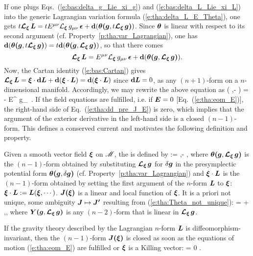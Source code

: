If one plugs Eqs.~(\ref{e:bas:delta_g_Lie_xi_g}) and (\ref{e:bas:delta_L_Lie_xi_L})
into the generic Lagrangian variation formula (\ref{e:tha:delta_L_E_Theta}), one gets
$t \bm{\mathcal{L}}_{\bm{\xi}}\, \bm{L}  = t E^{\mu\nu} {\mathcal{L}}_{\bm{\xi}}\, g_{\mu\nu} \,\bm{\epsilon} + \mathbf{d}( \bm{\theta}\textbf{(}\bm{g},t\bm{\mathcal{L}}_{\bm{\xi}}\,\bm{g}\textbf{)})$.
Since $\bm{\theta}$ is linear with respect to its second argument (cf. Property~\ref{p:tha:var_Lagrangian}),
one has
$\mathbf{d}( \bm{\theta}\textbf{(}\bm{g},t\bm{\mathcal{L}}_{\bm{\xi}}\,\bm{g}\textbf{)}) =  t \mathbf{d}( \bm{\theta}\textbf{(}\bm{g},\bm{\mathcal{L}}_{\bm{\xi}}\,\bm{g}\textbf{)})$, so that there comes
\[
    \bm{\mathcal{L}}_{\bm{\xi}}\, \bm{L}  = E^{\mu\nu} {\mathcal{L}}_{\bm{\xi}}\, g_{\mu\nu} \,\bm{\epsilon} + \mathbf{d}( \bm{\theta}\textbf{(}\bm{g},\bm{\mathcal{L}}_{\bm{\xi}}\,\bm{g}\textbf{)}) .
\]
Now, the Cartan identity (\ref{e:bas:Cartan}) gives
$\bm{\mathcal{L}}_{\bm{\xi}}\, \bm{L} = \bm{\xi} \cdot\mathbf{d} \bm{L} + \mathbf{d}(\bm{\xi}\cdot\bm{L}) = \mathbf{d}(\bm{\xi}\cdot\bm{L})$
since $\mathbf{d} \bm{L} = 0$, as any $(n+1)$-form on a $n$-dimensional manifold.
Accordingly, we may rewrite the above equation as
\be \label{e:tha:dd_pre_J_E}
    \dd\left(  \w{\theta}\lld{},\Lie{\xi}\rld - \w{\xi}\cdot{} \right) =
    - E^{\mu\nu} \Liec{\xi} g_{\mu\nu} \,\weps .
\ee
If the field equations are fulfilled, i.e. if $\bm{E} = 0$ [Eq.~(\ref{e:tha:eom_E})], the
right-hand side of Eq.~(\ref{e:tha:dd_pre_J_E}) is zero, which implies that the
argument of the exterior derivative in the left-hand side is a closed
$(n-1)$-form. This defines a conserved current and motivates the following definition and property.

\begin{prop}
\label{p:tha:Noether_current}
Given a smooth vector field $\bm{\xi}$ on $\mathscr{M}$,
the  is defined by \cite{Wald93,IyerW94}
\be \label{e:tha:def_Noether_current}
    \lld\w{\xi}\rld := \w{\theta}\lld{},\Lie{\xi}\rld - \w{\xi}\cdot{} ,
\ee
where $\bm{\theta}\textbf{(}\bm{g},\bm{\mathcal{L}}_{\bm{\xi}}\,\bm{g}\textbf{)}$ is the $(n-1)$-form obtained
by substituting $\bm{\mathcal{L}}_{\bm{\xi}}\,\bm{g}$ for $\delta\bm{g}$ in the
presymplectic potential form $\bm{\theta}\textbf{(}\bm{g},\delta\bm{g}\textbf{)}$
(cf. Property~\ref{p:tha:var_Lagrangian}) and $\bm{\xi}\cdot\bm{L}$
is the $(n-1)$-form obtained by setting the first argument of the $n$-form $\bm{L}$
to $\bm{\xi}$:  $\bm{\xi}\cdot\bm{L} := \bm{L}(\bm{\xi},\cdots)$.
$\bm{J}\textbf{(}\bm{\xi}\textbf{)}$ is a linear and local function of $\bm{\xi}$. It is a priori not unique,
some ambiguity $\bm{J}\mapsto \bm{J'}$ resulting from (\ref{e:tha:Theta_not_unique}):
\be \label{e:tha:J_not_unique}
     \lld\w{\xi}\rld =  \lld\w{\xi}\rld  + \dd {}\lld{},\Lie{\xi}\rld,
\ee
where $\bm{Y}\textbf{(}\bm{g},\bm{\mathcal{L}}_{\bm{\xi}}\,\bm{g}\textbf{)}$ is any $(n-2)$-form that is linear in $\bm{\mathcal{L}}_{\bm{\xi}}\,\bm{g}$.

If the gravity theory described by the Lagrangian $n$-form $\bm{L}$ is diffeomorphism-invariant, then
the $(n-1)$-form $\bm{J}\textbf{(}\bm{\xi}\textbf{)}$ is closed as soon as the equations of motion (\ref{e:tha:eom_E}) are fulfilled  or $\bm{\xi}$ is a Killing vector:
\be \label{e:tha:J_closed}
    \dd {}\lld\w{\xi}\rld  = 0 .
\ee
\end{prop}

